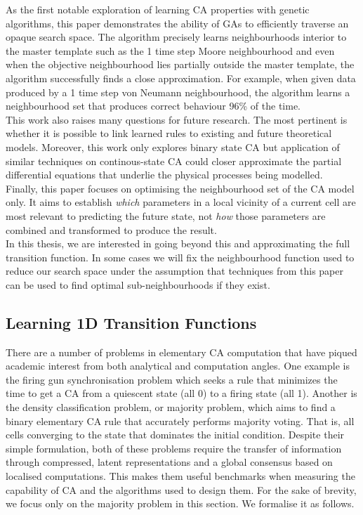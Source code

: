 As the first notable exploration of learning CA properties with genetic algorithms, this paper demonstrates the ability of GAs to efficiently traverse an opaque search space. The algorithm precisely learns neighbourhoods interior to the master template such as the 1 time step Moore neighbourhood and even when the objective neighbourhood lies partially outside the master template, the algorithm successfully finds a close approximation. For example, when given data produced by a 1 time step von Neumann neighbourhood, the algorithm learns a neighbourhood set that produces correct behaviour 96\% of the time.\\

This work also raises many questions for future research. The most pertinent is whether it is possible to link learned rules to existing and future theoretical models. Moreover, this work only explores binary state CA but application of similar techniques on continous-state CA could closer approximate the partial differential equations that underlie the physical processes being modelled.\\

Finally, this paper focuses on optimising the neighbourhood set of the CA model only. It aims to establish \textit{which} parameters in a local vicinity of a current cell are most relevant to predicting the future state, not \textit{how} those parameters are combined and transformed to produce the result.\\ In this thesis, we are interested in going beyond this and approximating the full transition function. In some cases we will fix the neighbourhood function used to reduce our search space under the assumption that techniques from this paper can be used to find optimal sub-neighbourhoods if they exist.\\


\subsection{Learning 1D Transition Functions}

There are a number of problems in elementary CA computation that have piqued academic interest from both analytical and computation angles. One example is the firing gun synchronisation problem\cite{moore1964firing} which seeks a rule that minimizes the time to get a CA from a quiescent state (all 0) to a firing state (all 1). Another is the density classification problem, or majority problem, which aims to find a binary elementary CA rule that accurately performs majority voting. That is, all cells converging to the state that dominates the initial condition. Despite their simple formulation, both of these problems require the transfer of information through compressed, latent representations and a global consensus based on localised computations. This makes them useful benchmarks when measuring the capability of CA and the algorithms used to design them. For the sake of brevity, we focus only on the majority problem in this section. We formalise it as follows.

